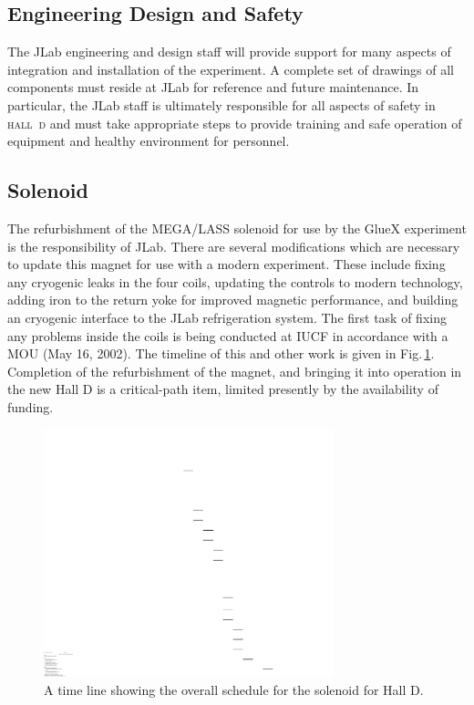 \documentclass[oneside,12pt,letterpaper]{article}
\newcommand{\hd}{\mbox{\textsc{hall d}}}
\begin{document}
\subsection{Engineering Design and Safety}
The JLab engineering and design staff will provide support
for many aspects of integration and installation of the
experiment. A complete set of drawings of all components
must reside at JLab for reference and future maintenance.
In particular, the JLab staff is ultimately responsible for
all aspects of safety in \hd{} and must take appropriate
steps to provide training and safe operation of equipment
and healthy environment for personnel.  

\subsection{Solenoid}
The refurbishment of the MEGA/LASS solenoid for use by the 
GlueX experiment is the responsibility of JLab. There are
several modifications which are necessary to update this
magnet for use with a modern experiment. These include
fixing any cryogenic leaks in the four coils, updating
the controls to modern technology, adding iron to the
return yoke for improved magnetic performance, and building
an cryogenic interface to the JLab refrigeration system.
The first task of fixing any problems inside the coils is
being conducted at IUCF in accordance with a MOU (May 16, 2002).
The timeline of this and other work is given
in Fig.\,\ref{fig:solenoid_timeline}. Completion of the 
refurbishment of the magnet, and bringing it into operation
in the new Hall D is a critical-path item, limited presently
by the availability of funding.

\begin{figure}[h!]\centering
\includegraphics[width=0.75\textwidth]{solenoid_timeline.pdf}
\caption[]{\label{fig:solenoid_timeline} A time line showing the 
overall schedule for the solenoid for Hall D.}
\end{figure}
\end{document}
